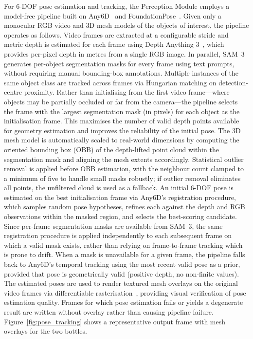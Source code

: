\documentclass[sensors,article,submit,pdftex,moreauthors]{Definitions/mdpi}
\begin{document}
For 6-DOF pose estimation and tracking, the Perception Module employs a model-free pipeline built on Any6D~\cite{any6d} and FoundationPose~\cite{foundationpose}. Given only a monocular RGB video and 3D mesh models of the objects of interest, the pipeline operates as follows.
Video frames are extracted at a configurable stride and metric depth is estimated for each frame using Depth Anything 3~\cite{depthanything3}, which provides per-pixel depth in metres from a single RGB image. In parallel, SAM~3~\cite{sam3, sam3dobjects} generates per-object segmentation masks for every frame using text prompts, without requiring manual bounding-box annotations. Multiple instances of the same object class are tracked across frames via Hungarian matching on detection-centre proximity.
Rather than initialising from the first video frame---where objects may be partially occluded or far from the camera---the pipeline selects the frame with the largest segmentation mask (in pixels) for each object as the initialisation frame. This maximises the number of valid depth points available for geometry estimation and improves the reliability of the initial pose.
 The 3D mesh model is automatically scaled to real-world dimensions by computing the oriented bounding box (OBB) of the depth-lifted point cloud within the segmentation mask and aligning the mesh extents accordingly. Statistical outlier removal is applied before OBB estimation, with the neighbour count clamped to a minimum of five to handle small masks robustly; if outlier removal eliminates all points, the unfiltered cloud is used as a fallback.
An initial 6-DOF pose is estimated on the best initialisation frame via Any6D's registration procedure, which samples random pose hypotheses, refines each against the depth and RGB observations within the masked region, and selects the best-scoring candidate. Since per-frame segmentation masks are available from SAM~3, the same registration procedure is applied independently to each subsequent frame on which a valid mask exists, rather than relying on frame-to-frame tracking which is prone to drift. When a mask is unavailable for a given frame, the pipeline falls back to Any6D's temporal tracking using the most recent valid pose as a prior, provided that pose is geometrically valid (positive depth, no non-finite values).
The estimated poses are used to render textured mesh overlays on the original video frames via differentiable rasterisation~\cite{nvdiffrast}, providing visual verification of pose estimation quality. Frames for which pose estimation fails or yields a degenerate result are written without overlay rather than causing pipeline failure. Figure~\ref{fig:pose_tracking} shows a representative output frame with mesh overlays for the two bottles.
\end{document}
